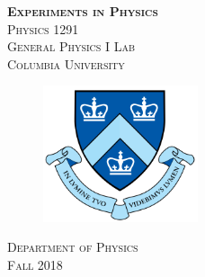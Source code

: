 \begin{titlepage}
\begin{center}
\textsc{\Huge\bf Experiments in Physics}
\\[5cm]
\textsc{\huge Physics 1291}
\\[0.3cm]
\textsc{\huge General Physics I Lab}
\\[4cm]
\textsc{\large Columbia University}
\\[0.5cm]
\begin{figure}[h]
  \centering
  \includegraphics[height=4cm]{./pic/Columbia-Logo.png}
\end{figure}
\textsc{Department of Physics}
\\[1cm]
\textsc{Fall 2018}
\end{center}
\end{titlepage}
